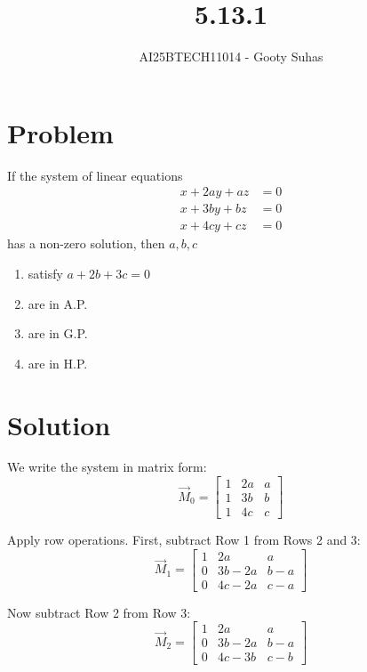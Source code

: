 \documentclass[journal]{IEEEtran}
\begin{document}

\vspace{3cm}

\title{5.13.1}
\author{AI25BTECH11014 - Gooty Suhas}
{\let\newpage\relax\maketitle}

\renewcommand{\thefigure}{\theenumi}
\renewcommand{\thetable}{\theenumi}
\setlength{\intextsep}{10pt}
\renewcommand{\thetable}{\theenumi}

\section*{\large\textbf{Problem}}

If the system of linear equations
\begin{align}
x + 2a y + a z &= 0 \\
x + 3b y + b z &= 0 \\
x + 4c y + c z &= 0
\end{align}
has a non-zero solution, then \( a, b, c \)
\begin{enumerate}[label=\alph*)]
    \item satisfy \( a + 2b + 3c = 0 \)
    \item are in A.P.
    \item are in G.P.
    \item are in H.P.
\end{enumerate}

\section*{\large\textbf{Solution}}

We write the system in matrix form:
\[
\vec{M}_0 =
\begin{bmatrix}
1 & 2a & a \\
1 & 3b & b \\
1 & 4c & c
\end{bmatrix}
\]

Apply row operations. First, subtract Row 1 from Rows 2 and 3:
\[
\vec{M}_1 =
\begin{bmatrix}
1 & 2a & a \\
0 & 3b - 2a & b - a \\
0 & 4c - 2a & c - a
\end{bmatrix}
\]

Now subtract Row 2 from Row 3:
\[
\vec{M}_2 =
\begin{bmatrix}
1 & 2a & a \\
0 & 3b - 2a & b - a \\
0 & 4c - 3b & c - b
\end{bmatrix}
\]
\end{document}
